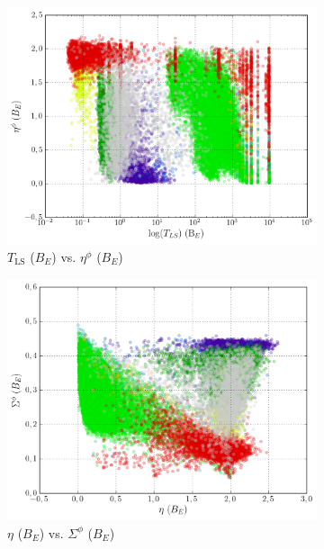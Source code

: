 \begin{figure}[H]
	\centering
	\begin{subfigure}[t]{0.49\textwidth}
		\centering
		\caption{$T_{\text{LS}}$ ($B_E$) vs. $\eta^\phi$ ($B_E$)}
		\label{fig:2a}
		\includegraphics[width=\textwidth]{figures/scatterplots/B-ls-period-B-phase-eta.png}
	\end{subfigure}
	\begin{subfigure}[t]{0.49\textwidth}
		\centering
		\caption{$\eta$ ($B_E$) vs. $\Sigma^\phi$ ($B_E$)}
		\label{fig:2b}
		\includegraphics[width=\textwidth]{figures/scatterplots/B-eta-B-phase-cs.png}
	\end{subfigure}
	\begin{subfigure}[t]{0.49\textwidth}

\end{subfigure}
\end{figure}
